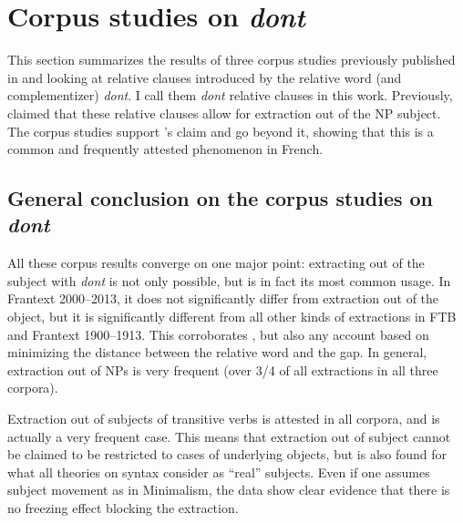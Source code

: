 \section{Corpus studies on \emph{dont}}
\label{ch:dont-corpus}
This section summarizes the results of three corpus studies previously published in \citet{Abeille.2016} and \citet{Abeille.2020.JFLS} looking at relative clauses introduced by the relative word (and complementizer) \emph{dont}. I call them \emph{dont} relative clauses in this work. Previously, \citet{Godard.1988} claimed that these relative clauses allow for extraction out of the NP subject. The corpus studies support \citeauthor{Godard.1988}'s claim and go beyond it, showing that this is a common and frequently attested phenomenon in French.






\subsection{General conclusion on the corpus studies on \emph{dont}}

All these corpus results converge on one major point: extracting out of the subject with \emph{dont} is not only possible, but is in fact its most common usage. In Frantext 2000--2013, it does not significantly differ from extraction out of the object, but it is significantly different from all other kinds of extractions in FTB and Frantext 1900--1913. This corroborates \citet{Godard.1988}, but also any account based on minimizing the distance between the relative word and the gap. 
In general, extraction out of NPs is very frequent (over 3/4 of all extractions in all three corpora). 

Extraction out of subjects of transitive verbs is attested in all corpora, and is actually a very frequent case. This means that extraction out of subject cannot be claimed to be restricted to cases of underlying objects, but is also found for what all theories on syntax consider as ``real'' subjects. Even if one assumes subject movement as in Minimalism, the data show clear evidence that there is no freezing effect blocking the extraction.

